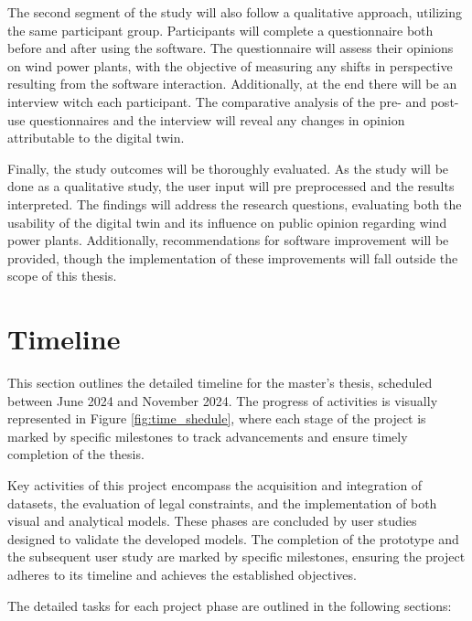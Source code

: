 \documentclass[11pt, titlepage, a4paper]{scrartcl}
\begin{document}
\begin{linenumbers}
    The second segment of the study will also follow a qualitative approach, utilizing the same participant group. Participants will complete a questionnaire both before and after using the software. The questionnaire will assess their opinions on wind power plants, with the objective of measuring any shifts in perspective resulting from the software interaction. Additionally, at the end there will be an interview witch each participant. The comparative analysis of the pre- and post-use questionnaires and the interview will reveal any changes in opinion attributable to the digital twin.

    Finally, the study outcomes will be thoroughly evaluated. As the study will be done as a qualitative study, the user input will pre preprocessed and the results interpreted. The findings will address the research questions, evaluating both the usability of the digital twin and its influence on public opinion regarding wind power plants. Additionally, recommendations for software improvement will be provided, though the implementation of these improvements will fall outside the scope of this thesis.


    \section{Timeline}
    This section outlines the detailed timeline for the master's thesis, scheduled between June 2024 and November 2024.
    The progress of activities is visually represented in Figure \ref{fig:time_shedule}, where each stage of the project is marked by specific milestones to track advancements and ensure timely completion of the thesis.


    Key activities of this project encompass the acquisition and integration of datasets, the evaluation of legal constraints, and the implementation of both visual and analytical models. These phases are concluded by user studies designed to validate the developed models. The completion of the prototype and the subsequent user study are marked by specific milestones, ensuring the project adheres to its timeline and achieves the established objectives.

    The detailed tasks for each project phase are outlined in the following sections:


\end{linenumbers}
\end{document}
